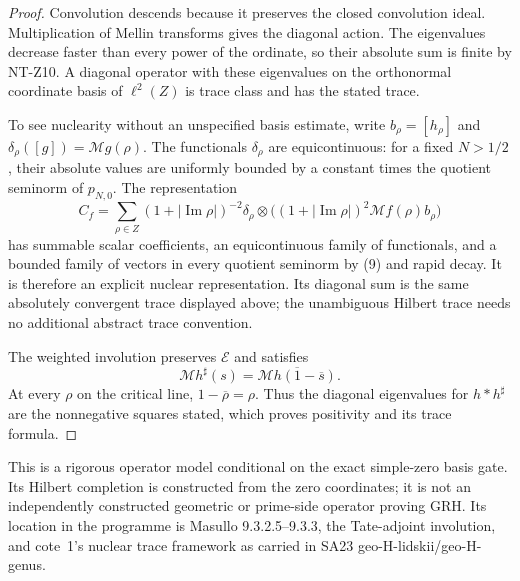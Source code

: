 \begin{proof}
Convolution descends because it preserves the closed
convolution ideal. Multiplication of Mellin transforms
gives the diagonal action. The eigenvalues decrease
faster than every power of the ordinate, so their
absolute sum is finite by NT-Z10. A diagonal operator
with these eigenvalues on the orthonormal coordinate
basis of $\ell^2(Z)$ is trace class and has the stated
trace.

To see nuclearity without an unspecified basis estimate,
write $b_\rho=[h_\rho]$ and
$\delta_\rho([g])=\mathcal Mg(\rho)$. The functionals
$\delta_\rho$ are equicontinuous: for a fixed
$N>1/2$, their absolute values are uniformly bounded
by a constant times the quotient seminorm of $p_{N,0}$.
The representation
\[
 C_f=\sum_{\rho\in Z}(1+|\operatorname{Im}\rho|)^{-2}
       \delta_\rho\otimes
       \bigl((1+|\operatorname{Im}\rho|)^2
                                  \mathcal Mf(\rho)b_\rho\bigr)
\]
has summable scalar coefficients, an equicontinuous
family of functionals, and a bounded family of vectors
in every quotient seminorm by (9) and rapid decay.
It is therefore an explicit nuclear representation.
Its diagonal sum is the same absolutely convergent
trace displayed above; the unambiguous Hilbert
trace needs no additional abstract trace convention.

The weighted involution preserves $\mathcal E$ and satisfies
\[
      \mathcal M h^\sharp(s)
                =\overline{\mathcal Mh(1-\overline s)}.
\]
At every $\rho$ on the critical line,
$1-\overline\rho=\rho$. Thus the diagonal eigenvalues
for $h*h^\sharp$ are the nonnegative squares stated,
which proves positivity and its trace formula.
\end{proof}

This is a rigorous operator model conditional on the exact
simple-zero basis gate. Its Hilbert completion is constructed
from the zero coordinates; it is not an independently
constructed geometric or prime-side operator proving GRH.
Its location in the programme is Masullo 9.3.2.5--9.3.3,
the Tate-adjoint involution, and cote~1's nuclear trace
framework as carried in SA23 geo-H-lidskii/geo-H-genus.
